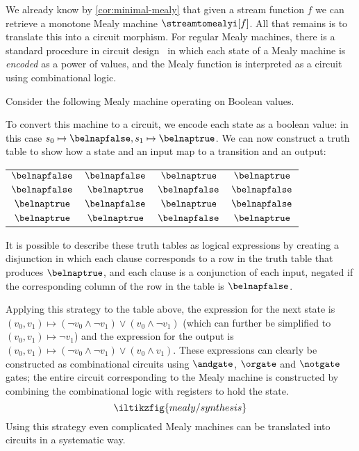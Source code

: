 \documentclass{lmcs}
\begin{document}
We already know by \autoref{cor:minimal-mealy} that given a stream function
\(f\) we can retrieve a monotone Mealy machine \(\streamtomealyi[f]\).
All that remains is to translate this into a circuit morphism.
For regular Mealy machines, there is a standard procedure in circuit
design~\cite{kohavi2009switching} in which each state of a Mealy machine is
\emph{encoded} as a power of values, and the Mealy function is interpreted as
a circuit using combinational logic.

\begin{exa}\label{ex:boolean-to-circuit}
    Consider the following Mealy machine operating on Boolean values.
    \begin{center}
        
    \end{center}
    \vspace{-\belowdisplayskip}
    To convert this machine to a circuit, we encode each state as a boolean
    value:
    in this case \(s_0 \mapsto \belnapfalse, s_1 \mapsto \belnaptrue\).
    We can now construct a truth table to show how a state and an input map to
    a transition and an output:
    \begin{center}
        \begin{tabular}{cc|cc}
            \(\belnapfalse\) & \(\belnapfalse\) & \(\belnaptrue\)  & \(\belnaptrue\)  \\
            \(\belnapfalse\) & \(\belnaptrue\)  & \(\belnapfalse\) & \(\belnapfalse\) \\
            \(\belnaptrue\)  & \(\belnapfalse\) & \(\belnaptrue\)  & \(\belnapfalse\) \\
            \(\belnaptrue\)  & \(\belnaptrue\)  & \(\belnapfalse\) & \(\belnaptrue\)  \\
        \end{tabular}
    \end{center}
    It is possible to describe these truth tables as logical expressions by
    creating a disjunction in which each clause corresponds to a row in the
    truth table that produces \(\belnaptrue\), and each clause is a conjunction
    of each input, negated if the corresponding column of the row in the table
    is \(\belnapfalse\).

    Applying this strategy to the table above, the expression for the next state
    is \(
    (v_0, v_1)
    \mapsto
    (\neg v_0 \land \neg v_1) \lor (v_0 \land \neg v_1)
    \) (which can further be simplified to \((v_0, v_1) \mapsto \neg v_1\))
    and the expression for the output is \(
    (v_0, v_1)
    \mapsto
    (\neg v_0 \land \neg v_1) \lor (v_0 \land v_1)
    \).
    These expressions can clearly be constructed as combinational circuits using
    \(\andgate\), \(\orgate\) and \(\notgate\) gates; the entire circuit
    corresponding to the Mealy machine is constructed by combining the
    combinational logic with registers to hold the state.
    \[\iltikzfig{mealy/synthesis}\]
    Using this strategy even complicated Mealy machines can be translated into
    circuits in a systematic way.
\end{exa}
\end{document}

